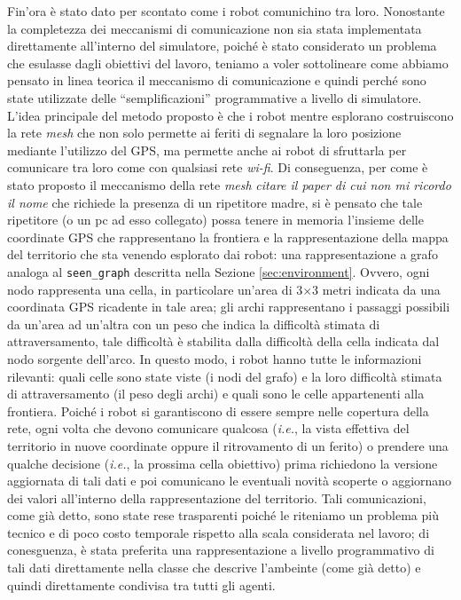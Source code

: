 Fin'ora è stato dato per scontato come i robot comunichino tra loro.
Nonostante la completezza dei meccanismi di comunicazione non sia stata implementata direttamente all'interno del simulatore, poiché è stato considerato un problema che esulasse dagli obiettivi del lavoro, teniamo a voler sottolineare come abbiamo pensato in linea teorica il meccanismo di comunicazione e quindi perché sono state utilizzate delle “semplificazioni” programmative a livello di simulatore.
L'idea principale del metodo proposto è che i robot mentre esplorano costruiscono la rete \textit{mesh} che non solo permette ai feriti di segnalare la loro posizione mediante l'utilizzo del GPS, ma permette anche ai robot di sfruttarla per comunicare tra loro come con qualsiasi rete \textit{wi-fi}.
Di conseguenza, per come è stato proposto il meccanismo della rete \textit{mesh} \textit{citare il paper di cui non mi ricordo il nome} che richiede la presenza di un ripetitore madre, si è pensato che tale ripetitore (o un pc ad esso collegato) possa tenere in memoria l'insieme delle coordinate GPS che rappresentano la frontiera e la rappresentazione della mappa del territorio che sta venendo esplorato dai robot: una rappresentazione a grafo analoga al \texttt{seen\_graph} descritta nella Sezione \ref{sec:environment}.
Ovvero, ogni nodo rappresenta una cella, in particolare un'area di 3$\times$3 metri indicata da una coordinata GPS ricadente in tale area; gli archi rappresentano i passaggi possibili da un'area ad un'altra con un peso che indica la difficoltà stimata di attraversamento, tale difficoltà è stabilita dalla difficoltà della cella indicata dal nodo sorgente dell'arco.
In questo modo, i robot hanno tutte le informazioni rilevanti: quali celle sono state viste (i nodi del grafo) e la loro difficoltà stimata di attraversamento (il peso degli archi) e quali sono le celle appartenenti alla frontiera.
Poiché i robot si garantiscono di essere sempre nelle copertura della rete, ogni volta che devono comunicare qualcosa (\textit{i.e.}, la vista effettiva del territorio in nuove coordinate oppure il ritrovamento di un ferito) o prendere una qualche decisione (\textit{i.e.}, la prossima cella obiettivo) prima richiedono la versione aggiornata di tali dati e poi comunicano le eventuali novità scoperte o aggiornano dei valori all'interno della rappresentazione del territorio.
Tali comunicazioni, come già detto, sono state rese trasparenti poiché le riteniamo un problema più tecnico e di poco costo temporale rispetto alla scala considerata nel lavoro; di conesguenza, è stata preferita una rappresentazione a livello programmativo di tali dati direttamente nella classe che descrive l'ambeinte (come già detto) e quindi direttamente condivisa tra tutti gli agenti.

